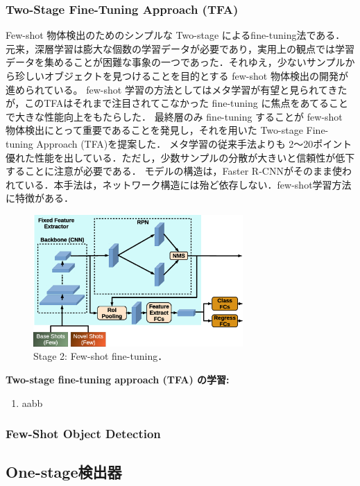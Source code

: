 \documentclass[originalpaper]{jsaiart}     %
\begin{document}
\subsubsection{Two-Stage Fine-Tuning Approach (TFA)}
Few-shot 物体検出のためのシンプルな Two-stage によるfine-tuning法である\cite{WHGDY20}．
元来，深層学習は膨大な個数の学習データが必要であり，実用上の観点では学習データを集めることが困難な事象の一つであった．それゆえ，少ないサンプルから珍しいオブジェクトを見つけることを目的とする few-shot 物体検出の開発が進められている。
few-shot 学習の方法としてはメタ学習が有望と見られてきたが，このTFAはそれまで注目されてこなかった fine-tuning に焦点をあてることで大きな性能向上をもたらした．
最終層のみ fine-tuning することが few-shot 物体検出にとって重要であることを発見し，それを用いた Two-stage Fine-tuning Approach (TFA)を提案した．
メタ学習の従来手法よりも 2〜20ポイント優れた性能を出している．ただし，少数サンプルの分散が大きいと信頼性が低下することに注意が必要である．
モデルの構造は，Faster R-CNNがそのまま使われている．本手法は，ネットワーク構造には殆ど依存しない．few-shot学習方法に特徴がある．

\begin{figure}[tb]
    \begin{center}
        \includegraphics[width=8cm,clip]{fig/archi_TFA.eps}
    \end{center}
    \caption{ Stage 2: Few-shot fine-tuning．}
    \label{fig:archi_TFA}
\end{figure}
{\bf Two-stage fine-tuning approach (TFA) の学習:\ } 
\begin{enumerate}
    \item aabb
\end{enumerate}

\subsubsection{Few-Shot Object Detection}

\subsection{One-stage検出器}
\end{document}
